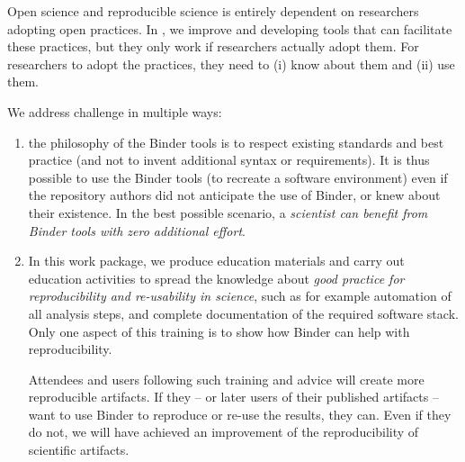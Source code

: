\begin{workpackage}[id=education,wphases=0-36,swsites,
  title=Education and Dissemination,
  short=Education,
  lead=IFR,
  IFRRM=10,
  MPRM=6,
  SRLRM=7,
  QSRM=3,
  UIORM=9
]
\begin{wpdescription}

  Open science and reproducible science is entirely dependent on researchers
  adopting open practices. In \TheProject, we improve and developing tools that
  can facilitate these practices, but they only work if researchers actually adopt
  them. For researchers to adopt the practices, they need to (i) know about them
  and (ii) use them.

  We address challenge in multiple ways:
  \begin{enumerate}
    \item the philosophy of the Binder tools is to respect existing standards and
      best practice (and not to invent additional syntax or requirements). It is
      thus possible to use the Binder tools (to recreate a software environment)
      even if the repository authors did not anticipate the use of Binder, or
      knew about their existence. In the best possible scenario, a
      \emph{scientist can benefit from Binder tools with zero additional effort}.

    \item In this work package, we produce education materials and carry out
      education activities to spread the knowledge about \emph{good practice for
        reproducibility and re-usability in science}, such as for example
      automation of all analysis steps, and complete documentation of the
      required software stack. Only one aspect of this training is to show how
      Binder can help with reproducibility.
    
      Attendees and users following such training and advice will create more
      reproducible artifacts. If they -- or later users of their published
      artifacts -- want to use Binder to reproduce or re-use the results, they
      can. Even if they do not, we will have achieved an improvement of the
      reproducibility of scientific artifacts.
  \end{enumerate}



\end{wpdescription}
\end{workpackage}
